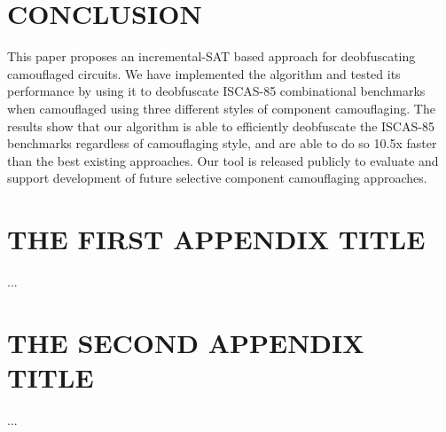 \documentclass[proposal]{umassthesis}  %
\begin{document}
\chapter{CONCLUSION}

This paper proposes an incremental-SAT based approach for deobfuscating camouflaged circuits. We have implemented the algorithm and tested its performance by using it to deobfuscate ISCAS-85 combinational benchmarks when camouflaged using three different styles of component camouflaging. The results show that our algorithm is able to efficiently deobfuscate the ISCAS-85 benchmarks regardless of camouflaging style, and are able to do so 10.5x faster than the best existing approaches. Our tool is released publicly to evaluate and support development of future selective component camouflaging approaches. 


\appendix
\chapter{THE FIRST APPENDIX TITLE}
...
\chapter{THE SECOND APPENDIX TITLE}
...

\backmatter  %




\end{document}
